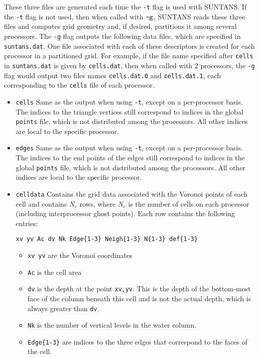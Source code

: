 \documentclass[12pt,oneside]{article}
\begin{document}
These three files are generated each time the \verb+-t+ flag is used with SUNTANS.  If
the \verb+-t+ flag is not used, then when called with $\verb+-g+$, SUNTANS reads these
three files and computes grid geometry and, if desired, partitions it among several processors.
The \verb+-g+ flag outputs the following data files, which are specified in \verb+suntans.dat+.
One file associated with each of these descriptors is created for each processor in a partitioned
grid.  For example, if the file name specified after \verb+cells+ in \verb+suntans.dat+ is given
by \verb+cells.dat+, then when called with 2 processors, the \verb+-g+ flag would output two files
names \verb+cells.dat.0+ and \verb+cells.dat.1+, each corresponding to the \verb+cells+ file of
each processor.
\begin{itemize}
\item \verb+cells+ Same as the output when using \verb+-t+, except on a per-processor basis.
The indices to the triangle vertices still correspond to indices in the global \verb+points+ file, which is
not distributed among the processors.  All other indices are local to the specific processor.
\item \verb+edges+ Same as the output when using \verb+-t+, except on a per-processor basis.
The indices to the end points of the edges still correspond to indices in the global \verb+points+ file, which is
not distributed among the processors.  All other indices are local to the specific processor.
\item \verb+celldata+ Contains the grid data associated with the Voronoi points of each cell and contains
$N_c$ rows, where $N_c$ is the number of cells on each processor (including interprocessor ghost points).
Each row contains the following entries:
\begin{verbatim}
xv yv Ac dv Nk Edge{1-3} Neigh{1-3} N{1-3} def{1-3}
\end{verbatim}
\begin{itemize}
\item \verb+xv yv+ are the Voronoi coordinates
\item \verb+Ac+ is the cell area
\item \verb+dv+ is the depth at the point \verb+xv,yv+.  This is the depth of the bottom-most
face of the column beneath this cell and is not the actual depth, which is always greater than
\verb+dv+.
\item \verb+Nk+ is the number of vertical levels in the water column.
\item \verb+Edge{1-3}+ are indices to the three edges that correspond to the faces of the cell.

\end{itemize}
\end{itemize}
\end{document}
